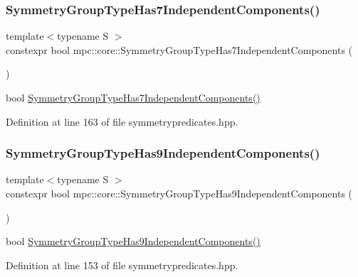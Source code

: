 \subsubsection{\texorpdfstring{Symmetry\+Group\+Type\+Has7\+Independent\+Components()}{SymmetryGroupTypeHas7IndependentComponents()}}
{\footnotesize\ttfamily template$<$typename S $>$ \\
constexpr bool mpc\+::core\+::\+Symmetry\+Group\+Type\+Has7\+Independent\+Components (\begin{DoxyParamCaption}{ }\end{DoxyParamCaption})\hspace{0.3cm}{\ttfamily [inline]}}

bool \mbox{\hyperlink{namespacempc_1_1core_accdfd67f26b27f03bbab68358d954bb0}{Symmetry\+Group\+Type\+Has7\+Independent\+Components()}} 

Definition at line 163 of file symmetrypredicates.\+hpp.

\mbox{\label{namespacempc_1_1core_aa01c4ada3a7c3a782f270df513b509f1}} 
\subsubsection{\texorpdfstring{Symmetry\+Group\+Type\+Has9\+Independent\+Components()}{SymmetryGroupTypeHas9IndependentComponents()}}
{\footnotesize\ttfamily template$<$typename S $>$ \\
constexpr bool mpc\+::core\+::\+Symmetry\+Group\+Type\+Has9\+Independent\+Components (\begin{DoxyParamCaption}{ }\end{DoxyParamCaption})\hspace{0.3cm}{\ttfamily [inline]}}

bool \mbox{\hyperlink{namespacempc_1_1core_aa01c4ada3a7c3a782f270df513b509f1}{Symmetry\+Group\+Type\+Has9\+Independent\+Components()}} 

Definition at line 153 of file symmetrypredicates.\+hpp.

\mbox{\label{namespacempc_1_1core_a4fc1927e7fe7eb577a6bef4ab6bfb4e4}} 
